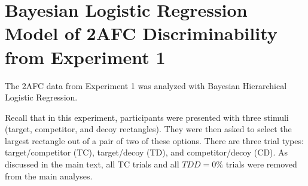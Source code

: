 \chapter{Bayesian Logistic Regression Model of 2AFC Discriminability from Experiment 1}
The 2AFC data from Experiment 1 was analyzed with Bayesian Hierarchical Logistic Regression. 

Recall that in this experiment, participants were presented with three stimuli (target, competitor, and decoy rectangles). They were then asked to select the largest rectangle out of a pair of two of these options. There are three trial types: target/competitor (TC), target/decoy (TD), and competitor/decoy (CD). As discussed in the main text, all TC trials and all $TDD = 0\%$ trials were removed from the main analyses.





